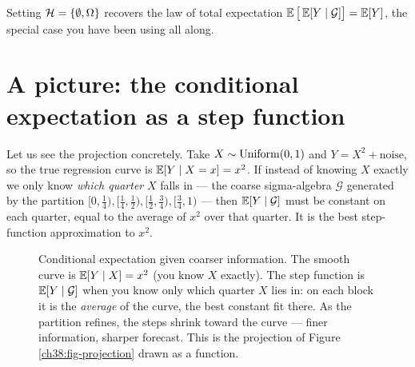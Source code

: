 Setting $\mathcal{H} = \{\emptyset, \Omega\}$ recovers the law of total expectation
$\operatorname{\mathbb{E}}\big[\operatorname{\mathbb{E}}[Y\mid\mathcal{G}]\big] = \operatorname{\mathbb{E}}[Y]$, the special case you have been using all along.

\section{A picture: the conditional expectation as a step function}
\label{ch38:step-figure}

Let us see the projection concretely. Take $X \sim \operatorname{Uniform}(0,1)$ and $Y = X^2 + \text{noise}$, so the
true regression curve is $\operatorname{\mathbb{E}}[Y\mid X = x] = x^2$. If instead of knowing $X$ exactly we only know
\emph{which quarter} $X$ falls in --- the coarse sigma-algebra $\mathcal{G}$ generated by the
partition $[0,\tfrac14), [\tfrac14,\tfrac12), [\tfrac12,\tfrac34), [\tfrac34,1)$ --- then
$\operatorname{\mathbb{E}}[Y\mid\mathcal{G}]$ must be constant on each quarter, equal to the average of $x^2$ over that
quarter. It is the best step-function approximation to $x^2$.

\begin{figure}[H]
\centering
{}
\caption{Conditional expectation given coarser information. The smooth curve is $\operatorname{\mathbb{E}}[Y\mid X]=x^2$
(you know $X$ exactly). The step function is $\operatorname{\mathbb{E}}[Y\mid\mathcal{G}]$ when you know only which quarter
$X$ lies in: on each block it is the \emph{average} of the curve, the best constant fit there. As the
partition refines, the steps shrink toward the curve --- finer information, sharper forecast. This is
the projection of Figure \ref{ch38:fig-projection} drawn as a function.}
\label{ch38:fig-step}
\end{figure}

